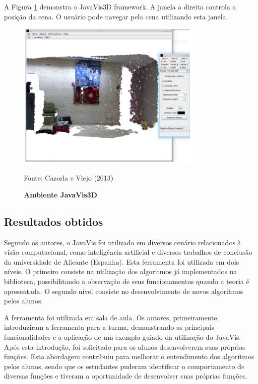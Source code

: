 \documentclass[
	12pt,				%
	oneside,			%
	a4paper,			%
	english,			%
	french,				%
	spanish,			%
	brazil,				%
	]{abntex2}
\begin{document}
A Figura \ref{fig:javavis_3d} demonstra o JavaVis3D framework. A janela a direita controla a posição da cena. O usuário pode navegar pela cena utilizando esta janela.

\begin{figure}[ht]
\centering
\caption{\textbf{Ambiente JavaVis3D}}
\includegraphics[width=0.8\textwidth]{imagens/javavis_3d.png}

Fonte: Cazorla e Viejo  (2013)
\label{fig:javavis_3d}
\end{figure}

\subsection{Resultados obtidos}

Segundo os autores, o JavaVis foi utilizado em diversos cenário relacionados à visão computacional, como inteligência artificial e diversos trabalhos de conclusão da universidade de Alicante (Espanha). Esta ferramenta foi utilizada em dois níveis. O primeiro consiste na utilização dos algoritmos já implementados na biblioteca, possibilitando a observação de seus funcionamentos quando a teoria é apresentada. O segundo nível consiste no desenvolvimento de novos algoritmos pelos alunos.

A ferramenta foi utilizada em sala de aula. Os autores, primeiramente, introduziram a ferramenta para a turma, demonstrando as principais funcionalidades e a aplicação de um exemplo guiado da utilização do JavaVis. Após esta introdução, foi solicitado para os alunos desenvolverem suas próprias funções. Esta abordagem contribuiu para melhorar o entendimento dos algoritmos pelos alunos, sendo que os estudantes puderam identificar o comportamento de diversas funções e tiveram a oportunidade de desenvolver suas próprias funções.
\end{document}
